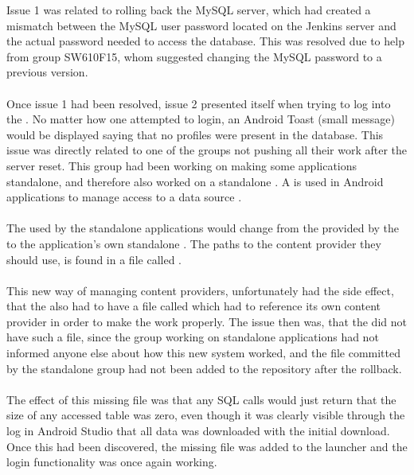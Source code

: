 Issue 1 was related to rolling back the MySQL server, which had created a mismatch between the MySQL user password located on the Jenkins server and the actual password needed to access the database. This was resolved due to help from group SW610F15, whom suggested changing the MySQL password to a previous version.
\\\\
Once issue 1 had been resolved, issue 2 presented itself when trying to log into the \giraf \launcher. No matter how one attempted to login, an Android Toast (small message) would be displayed saying that no profiles were present in the database. This issue was directly related to one of the groups not pushing all their work after the server reset. This group had been working on making some applications standalone, and therefore also worked on a standalone . A  is used in Android applications to manage access to a data source \parencite{android_content_provider}. 
\\\\
The  used by the standalone applications would change from the  provided by the \launcher to the application's own standalone . The paths to the content provider they should use, is found in a file called .
\\\\
This new way of managing content providers, unfortunately had the side effect, that the \launcher also had to have a file called  which had to reference its own content provider in order to make the \launcher work properly. The issue then was, that the \launcher did not have such a file, since the group working on standalone applications had not informed anyone else about how this new system worked, and the file committed by the standalone group had not been added to the \launcher repository after the rollback. 
\\\\
The effect of this missing file was that any SQL calls would just return that the size of any accessed table was zero, even though it was clearly visible through the log in Android Studio that all data was downloaded with the initial download. Once this had been discovered, the missing  file was added to the launcher and the login functionality was once again working.
\\\\
